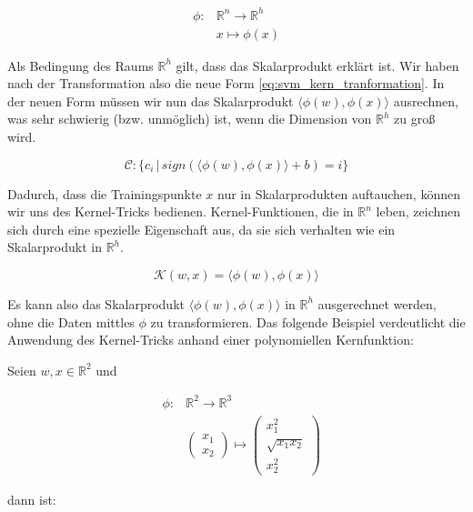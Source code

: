 \begin{eqnarray}
\label{eq:svm_kern_function}
    \phi : & \mathbb{R}^n \to \mathbb{R}^h \\
    & x \mapsto \phi(x)
\end{eqnarray}

Als Bedingung des Raums $\mathbb{R}^h$ gilt, dass das Skalarprodukt erklärt ist. 
Wir haben nach der Transformation also die neue Form \ref{eq:svm_kern_tranformation}. 
In der neuen Form müssen wir nun das Skalarprodukt $\langle\phi(w),\phi(x)\rangle$ ausrechnen, was sehr schwierig (bzw. unmöglich) ist, wenn die Dimension von $\mathbb{R}^h$ zu groß wird.

\begin{equation}
\label{eq:svm_kern_tranformation}
    \mathcal{C}: \{ c_i \,|\, sign(\langle \phi(w),\phi(x) \rangle + b) = i \}
\end{equation}

Dadurch, dass die Trainingspunkte $x$ nur in Skalarprodukten auftauchen, können wir uns des Kernel-Tricks bedienen.
Kernel-Funktionen, die in $\mathbb{R}^n$ leben, zeichnen sich durch eine spezielle Eigenschaft aus, da sie sich verhalten wie ein Skalarprodukt in $\mathbb{R}^h$. 

\begin{equation}
\label{eq:svm_kern_trick}
    \mathcal{K}(w,x) = \langle\phi(w),\phi(x)\rangle
\end{equation}

Es kann also das Skalarprodukt $\langle\phi(w),\phi(x)\rangle$ in $\mathbb{R}^h$ ausgerechnet werden, ohne die Daten mittles $\phi$ zu transformieren. 
Das folgende Beispiel verdeutlicht die Anwendung des Kernel-Tricks  anhand einer polynomiellen Kernfunktion:


Seien $w,x\in \mathbb{R}^2$ und

\begin{eqnarray*}
& \phi : & \mathbb{R}^2 \to \mathbb{R}^3 \\
& & \begin{pmatrix}
x_1 \\
x_2
\end{pmatrix}
\mapsto
\begin{pmatrix}
x_1^2 \\
\sqrt{x_1x_2} \\
x_2^2
\end{pmatrix}
\end{eqnarray*}

dann ist:

